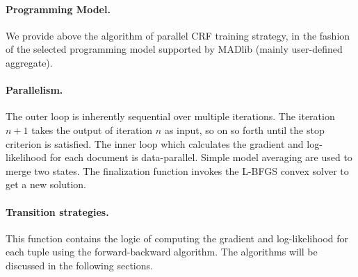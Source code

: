 \documentclass[11pt,letterpaper]{article}
\begin{document}
\paragraph{Programming Model.}
We provide above the algorithm of parallel CRF training strategy, in the fashion of the selected programming model supported by MADlib (mainly user-defined aggregate).

\paragraph{Parallelism.}
The outer loop is inherently sequential over multiple iterations.
The iteration $n+1$ takes the output of iteration $n$ as input, so on so forth until the stop criterion is satisfied.
The inner loop which calculates the gradient and log-likelihood for each document is data-parallel.
Simple model averaging are used to merge two states.
The finalization function invokes the L-BFGS convex solver to get a new solution. 



\paragraph{Transition strategies.}
This function contains the logic of computing the gradient and log-likelihood for each tuple using the forward-backward
algorithm. The algorithms will be discussed in the following sections.
\end{document}
